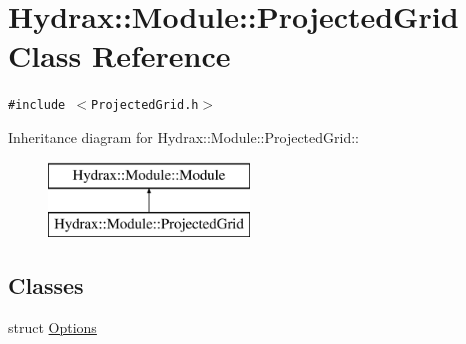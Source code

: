 \hypertarget{class_hydrax_1_1_module_1_1_projected_grid}{
\section{Hydrax::Module::ProjectedGrid Class Reference}
\label{class_hydrax_1_1_module_1_1_projected_grid}
}
{\tt \#include $<$ProjectedGrid.h$>$}

Inheritance diagram for Hydrax::Module::ProjectedGrid::\begin{figure}[H]
\begin{center}
\leavevmode
\includegraphics[height=2cm]{class_hydrax_1_1_module_1_1_projected_grid}
\end{center}
\end{figure}
\subsection*{Classes}
\begin{CompactItemize}
\item 
struct \hyperlink{struct_hydrax_1_1_module_1_1_projected_grid_1_1_options}{Options}
\end{CompactItemize}
